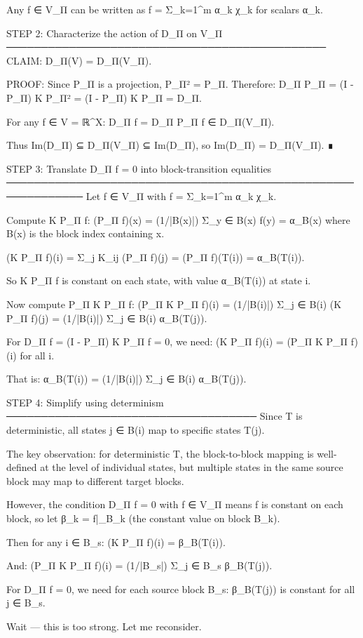 Any f ∈ V_Π can be written as f = Σ_{k=1}^m α_k χ_k for scalars α_k.

STEP 2: Characterize the action of D_Π on V_Π
──────────────────────────────────────────────
CLAIM: D_Π(V) = D_Π(V_Π).

PROOF: Since P_Π is a projection, P_Π² = P_Π.
Therefore:
D_Π P_Π = (I - P_Π) K P_Π² = (I - P_Π) K P_Π = D_Π.

For any f ∈ V = ℝ^X:
D_Π f = D_Π P_Π f ∈ D_Π(V_Π).

Thus Im(D_Π) ⊆ D_Π(V_Π) ⊆ Im(D_Π), so Im(D_Π) = D_Π(V_Π). ∎

STEP 3: Translate D_Π f = 0 into block-transition equalities
─────────────────────────────────────────────────────────────
Let f ∈ V_Π with f = Σ_{k=1}^m α_k χ_k.

Compute K P_Π f:
(P_Π f)(x) = (1/|B(x)|) Σ_{y ∈ B(x)} f(y) = α_{B(x)}
where B(x) is the block index containing x.

(K P_Π f)(i) = Σ_j K_{ij} (P_Π f)(j) = (P_Π f)(T(i)) = α_{B(T(i))}.

So K P_Π f is constant on each state, with value α_{B(T(i))} at state i.

Now compute P_Π K P_Π f:
(P_Π K P_Π f)(i) = (1/|B(i)|) Σ_{j ∈ B(i)} (K P_Π f)(j)
= (1/|B(i)|) Σ_{j ∈ B(i)} α_{B(T(j))}.

For D_Π f = (I - P_Π) K P_Π f = 0, we need:
(K P_Π f)(i) = (P_Π K P_Π f)(i) for all i.

That is:
α_{B(T(i))} = (1/|B(i)|) Σ_{j ∈ B(i)} α_{B(T(j))}.

STEP 4: Simplify using determinism
────────────────────────────────────
Since T is deterministic, all states j ∈ B(i) map to specific states T(j).

The key observation: for deterministic T, the block-to-block mapping is
well-defined at the level of individual states, but multiple states in the
same source block may map to different target blocks.

However, the condition D_Π f = 0 with f ∈ V_Π means f is constant on each
block, so let β_k = f|_{B_k} (the constant value on block B_k).

Then for any i ∈ B_s:
(K P_Π f)(i) = β_{B(T(i))}.

And:
(P_Π K P_Π f)(i) = (1/|B_s|) Σ_{j ∈ B_s} β_{B(T(j))}.

For D_Π f = 0, we need for each source block B_s:
β_{B(T(j))} is constant for all j ∈ B_s.

Wait — this is too strong. Let me reconsider.

